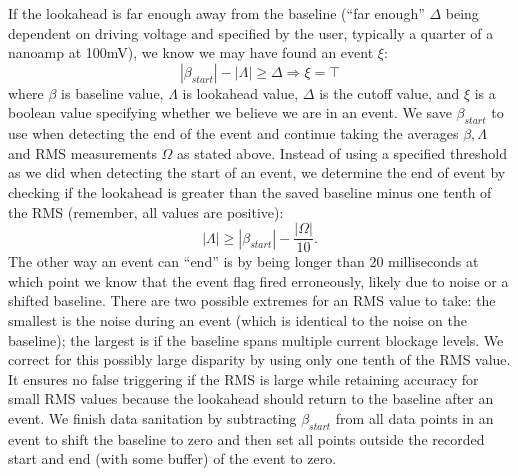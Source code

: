 \documentclass[aps,prl,preprint,groupedaddress]{revtex4}
\begin{document}
If the lookahead is far enough away from the baseline (``far enough'' \(\Delta\) being dependent on driving voltage and specified by the user, typically a quarter of a nanoamp at 100mV), we know we may have found an event \(\xi\):
\begin{equation} |\beta_{start}| - |\Lambda| \geq \Delta \Rightarrow \xi = \top \label{eq:event-start}\end{equation}
where \(\beta\) is baseline value, \(\Lambda\) is lookahead value, \(\Delta\) is the cutoff value, and \(\xi\) is a boolean value specifying whether we believe we are in an event.
We save \(\beta_{start}\) to use when detecting the end of the event and continue taking the averages \(\beta, \Lambda\) and RMS measurements \(\Omega\) as stated above.
Instead of using a specified threshold as we did when detecting the start of an event, we determine the end of event by checking if the lookahead is greater than the saved baseline minus one tenth of the RMS (remember, all values are positive):
\begin{equation}|\Lambda| \geq |\beta_{start}| - \frac{|\Omega|}{10}. \label{eq:event-end}\end{equation}
The other way an event can ``end'' is by being longer than 20 milliseconds at which point we know that the event flag fired erroneously, likely due to noise or a shifted baseline.
There are two possible extremes for an RMS value to take: the smallest is the noise during an event (which is identical to the noise on the baseline); the largest is if the baseline spans multiple current blockage levels.
We correct for this possibly large disparity by using only one tenth of the RMS value.
It ensures no false triggering if the RMS is large while retaining accuracy for small RMS values because the lookahead should return to the baseline after an event.
We finish data sanitation by subtracting \(\beta_{start}\) from all data points in an event to shift the baseline to zero and then set all points outside the recorded start and end (with some buffer) of the event to zero.
\end{document}
